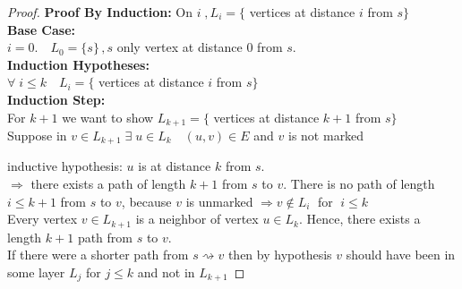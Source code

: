 \documentclass{article}
\theoremstyle{definition}
\theoremstyle{remark}
\theoremstyle{plain}
\begin{document}
\begin{proof}

\textbf{Proof By Induction:} On $i\;, L_i = \{$ vertices at distance $i$ from $s\}$\\

\textbf{Base Case:}\\
$i = 0.\quad L_0 = \{s\}\,,s$ only vertex at distance $0$ from $s$.\\

\textbf{Induction Hypotheses:}\\ 
$\forall\;i\leq k \quad L_i = \{$ vertices at distance $i$ from $s \}$\\

\textbf{Induction Step:}\\
For $k+1$ we want to show $L_{k+1} = \{$ vertices at distance $k+1$ from $s\}$\\
Suppose in $v \in L_{k+1} \; \exists \; u \in L_k \quad (u,v) \in E$ and $v$  is not marked\\



inductive hypothesis: $u$ is at distance $k$ from $s$.\\
$\Rightarrow$ there exists a path of length $k+1$ from $s$ to $v$.
There is no path of length $i \le k + 1$ from $s$ to $v$, because $v$ is unmarked $\Rightarrow v \notin L_i \; $ for $ \; i \leq k$\\

Every vertex $v \in L_{k+1}$ is a neighbor of vertex $u \in L_k$.  Hence, there exists a length $k+1$ path from $s$ to $v$.\\

If there were a shorter path from $s \rightsquigarrow v$ then by hypothesis $v$ should have been in some layer $L_j$ for $j \le k$ and not in $L_{k+1}$

\end{proof}
\end{document}
